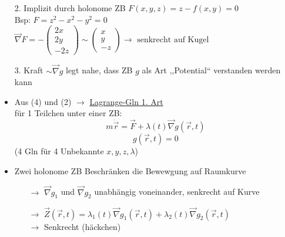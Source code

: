 \documentclass[titlepage,12pt,a4paper,ngerman]{report}
\newcommand{\tx}[1]{\textrm{#1}}
\begin{document}
{\begin{itemize}
	$ \begin{pmatrix}
	f_x\\f_y
	\end{pmatrix} = \frac{1}{\sqrt{x^2+y^2}} \begin{pmatrix}
	x\\y
	\end{pmatrix} \sim \begin{pmatrix}
	x\\y
	\end{pmatrix} $\\
	,,Höhenlinien``
	\item[2.] Implizit durch holonome ZB $ F(x,y,z) = z - f(x,y) = 0 $\\
	Bsp: $ F = z^2 - x^2 - y^2 = 0 $\\
	$ \vec{\nabla} F = - \begin{pmatrix}
	2x\\2y\\-2z
	\end{pmatrix} \sim \begin{pmatrix}
	x\\y\\-z
	\end{pmatrix} \rightarrow \tx{ senkrecht auf Kugel}$
	\item[3.] Kraft $ \sim \vec{\nabla}g $ legt nahe, dass ZB $g$ als Art ,,Potential`` verstanden werden kann
\end{itemize}
\begin{itemize}
	\item Aus (4) und (2) $ \rightarrow $ \underline{Lagrange-Gln 1. Art}\\
	für 1 Teilchen unter einer ZB:\\
	\begin{equation*}
	m\ddot{\vec{r}} = \vec{F} + \lambda(t) \vec{\nabla} g(\vec{r},t) \tag{5}
	\end{equation*}
	$$g(\vec{r},t) = 0$$
	(4 Gln für 4 Unbekannte $x,y,z,\lambda$)
	\item Zwei holonome ZB Beschränken die Bewewgung auf Raumkurve
	\begin{itemize}
		\item[$ \rightarrow $] $ \vec{\nabla}g_1 $ und $ \vec{\nabla}g_2 $ unabhängig voneinander, senkrecht auf Kurve
		\item[$ \rightarrow $] $ \vec{Z} (\vec{r},t) = \lambda_1(t) \vec{\nabla}g_1(\vec{r},t) + \lambda_2(t) \vec{\nabla}g_2(\vec{r},t) $\\
		$ \rightarrow $ Senkrecht (häckchen)
	\end{itemize}

\end{itemize}}
\end{document}
